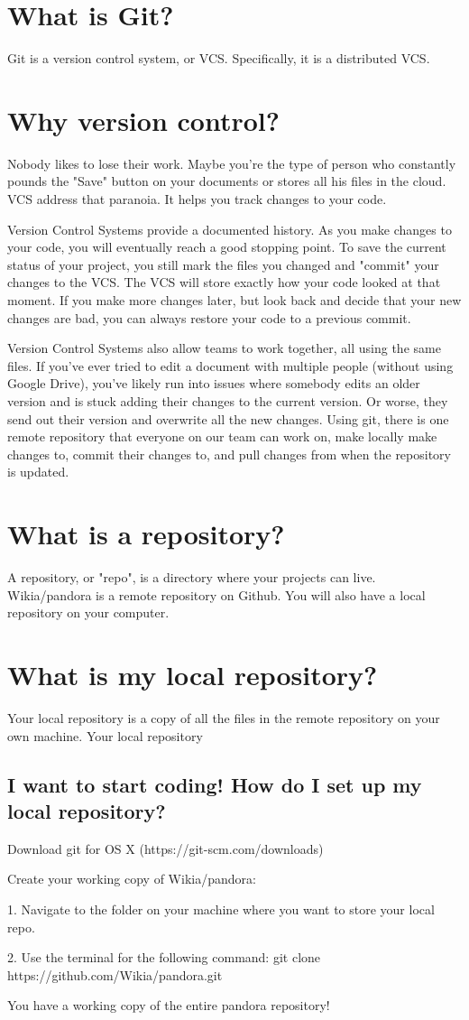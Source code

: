 \documentclass[oneside]{book}
\begin{document}
\section{What is Git?}
Git is a version control system, or VCS. Specifically, it is a distributed VCS.
\section{Why version control?}
Nobody likes to lose their work. Maybe you're the type of person who constantly pounds the "Save" button on your documents or stores all his files in the cloud. VCS address that paranoia. It helps you track changes to your code.\par
Version Control Systems provide a documented history. As you make changes to your code, you will eventually reach a good stopping point. To save the current status of your project, you still mark the files you changed and "commit" your changes to the VCS. The VCS will store exactly how your code looked at that moment. If you make more changes later, but look back and decide that your new changes are bad, you can always restore your code to a previous commit.\par
Version Control Systems also allow teams to work together, all using the same files. If you've ever tried to edit a document with multiple people (without using Google Drive), you've likely run into issues where somebody edits an older version and is stuck adding their changes to the current version. Or worse, they send out their version and overwrite all the new changes. Using git, there is one remote repository that everyone on our team can work on, make locally make changes to, commit their changes to, and pull changes from when the repository is updated.
\section{What is a repository?}
A repository, or "repo", is a directory where your projects can live. Wikia/pandora is a remote repository on Github. You will also have a local repository on your computer. 
\section{What is my local repository?}
Your local repository is a copy of all the files in the remote repository on your own machine. Your local repository
\subsection{I want to start coding! How do I set up my local repository?}
\noindent Download git for OS X (https://git-scm.com/downloads)\par
\noindent Create your working copy of Wikia/pandora:\par
1. Navigate to the folder on your machine where you want to store your local repo.\par
2. Use the terminal for the following command: git clone https://github.com/Wikia/pandora.git \par
\noindent You have a working copy of the entire pandora repository!
\end{document}
